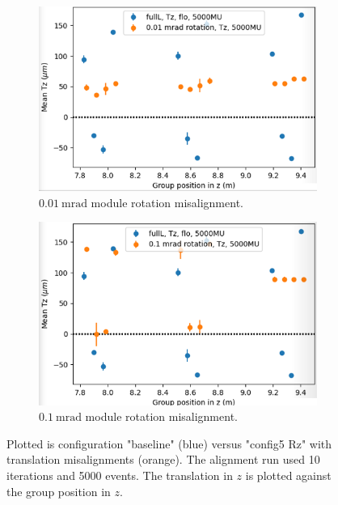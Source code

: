 \begin{figure}
  \centering
  \begin{subfigure}[b]{0.4\textwidth}
    \centering
    \includegraphics[width=\textwidth]{plots/misalign_rota/001_rot_Tz.png}
    \caption{$\SI{0.01}{\milli\radian}$ module rotation misalignment.}
    \label{fig:001Tz}
  \end{subfigure}
  \hfill
  \begin{subfigure}[b]{0.4\textwidth}
    \centering
    \includegraphics[width=\textwidth]{plots/misalign_rota/01_rot_Tz.png}
    \caption{$\SI{0.1}{\milli\radian}$ module rotation misalignment.}
    \label{fig:01Tz}
  \end{subfigure}
  \caption{Plotted is configuration "baseline" (blue) versus "config5 Rz" with translation misalignments (orange). The alignment run used 10 iterations and 5000 events. The translation in $z$ is plotted against the group position in $z$.}
  \label{fig:mis_rot_Tx}
\end{figure}

